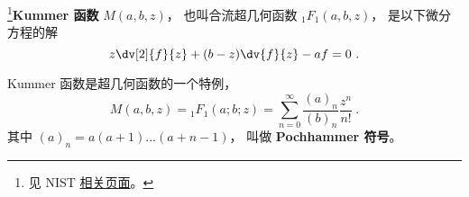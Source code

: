 
\begin{issues}
\issueDraft
\end{issues}

\footnote{见 NIST \href{https://dlmf.nist.gov/13.2}{相关页面}。}\textbf{Kummer 函数} $M(a, b, z)$， 也叫合流超几何函数 $_1F_1(a, b, z)$， 是以下微分方程的解
\begin{equation}\label{eq_Kummer_1}
z\dv[2]{f}{z} + (b-z)\dv{f}{z} - a f = 0~.
\end{equation}

Kummer 函数是超几何函数的一个特例， 
\begin{equation}
M(a, b, z) = {_1F_1}(a; b; z) = \sum_{n=0}^\infty \frac{(a)_n}{(b)_n} \frac{z^n}{n!}~.
\end{equation}
其中 $(a)_n = a(a+1)\dots(a+n-1)$， 叫做 \textbf{Pochhammer 符号}。


